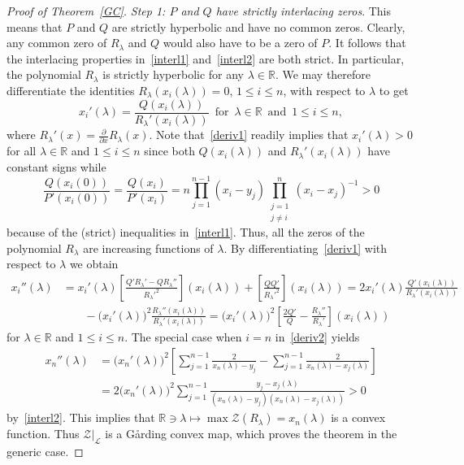 \documentclass[10pt,twoside,a4paper,reqno]{amsart}
\theoremstyle{plain}
\theoremstyle{definition}
\theoremstyle{remark}
\newcommand {\bR} {\mathbb {R}}
\newcommand {\la} {\lambda}
\newcommand {\calL} {\mathcal {L}}
\newcommand {\calZ} {\mathcal {Z}}
\begin{document}
\begin{proof}[Proof of Theorem~\ref{GC}]
{\em Step 1: $P$ and $Q$ have strictly interlacing zeros}. This means that 
$P$ and $Q$ are strictly hyperbolic and have no common zeros. Clearly, any 
common zero of $R_{\la}$ and $Q$ would also have to be a zero of $P$. It 
follows that the interlacing properties in~\eqref{interl1} 
and~\eqref{interl2} are both strict. In 
particular, the polynomial $R_{\la}$ is strictly hyperbolic for any 
$\la\in \bR$. We may therefore differentiate the identities 
$R_{\la}(x_i(\la))=0$, $1\le i\le n$, with respect to $\la$ to get
\begin{equation}\label{deriv1}
x_{i}'(\la)=\frac{Q(x_i(\la))}{R_{\la}'(x_i(\la))}\,\text{ for }\,
\la\in \bR\,\text{ and }\,1\le i\le n,
\end{equation}
where $R_{\la}'(x)=\frac{\partial}{\partial x}R_{\la}(x)$. Note 
that~\eqref{deriv1} readily 
implies that $x_{i}'(\la)>0$ for all $\la\in \bR$ and $1\le i\le n$ since 
both $Q(x_i(\la))$ and $R_{\la}'(x_i(\la))$ have constant signs while
$$\frac{Q(x_i(0))}{P'(x_i(0))}=\frac{Q(x_i)}{P'(x_i)}=
n\prod_{j=1}^{n-1}(x_i-y_j)
\prod_{\substack{j=1\\ j\neq i}}^{n}(x_i-x_j)^{-1}>0$$
because of the (strict) inequalities in~\eqref{interl1}. Thus, all 
the zeros of the polynomial $R_{\la}$ are increasing functions of $\la$. 
By differentiating~\eqref{deriv1} with respect to $\la$ we obtain
\begin{equation}\label{deriv2}
\begin{split}
x_{i}''(\la) & = x_{i}'(\la)\left[\frac{Q'R_{\la}'-QR_{\la}''}
{R_{\la}'^2}\right]\!(x_i(\la))+\left[\frac{QQ'}{R_{\la}'^2}\right]\!
(x_i(\la))= 2x_{i}'(\la)\frac{Q'(x_i(\la))}{R_{\la}'(x_i(\la))}\\
& \phantom{= x} -\big(x_{i}'(\la)\big)^2
\frac{R_{\la}''(x_i(\la))}{R_{\la}'(x_i(\la))}
= \big(x_{i}'(\la)\big)^2\left[\frac{2Q'}{Q}-
\frac{R_{\la}''}{R_{\la}'}\right]\!(x_i(\la))
\end{split}
\end{equation}
for $\la\in \bR$ and $1\le i\le n$. The special case when $i=n$ 
in~\eqref{deriv2} yields
\begin{equation*}
\begin{split}
x_{n}''(\la) & = \big(x_{n}'(\la)\big)^2\left[\sum_{j=1}^{n-1}
\frac{2}{x_n(\la)-y_j}-\sum_{j=1}^{n-1}\frac{2}{x_n(\la)-x_j(\la)}\right]\\
& = 2\big(x_{n}'(\la)\big)^2\sum_{j=1}^{n-1}\frac{y_j-x_j(\la)}
{(x_n(\la)-y_j)(x_n(\la)-x_j(\la))}>0
\end{split}
\end{equation*}
by~\eqref{interl2}. This implies that 
$\bR\ni \la\mapsto \max \calZ(R_{\la})=x_n(\la)$ is a convex function. Thus 
$\calZ|_{\calL}$ is a G\aa rding convex map, which 
proves the theorem in the generic case.


\end{proof}
\end{document}
